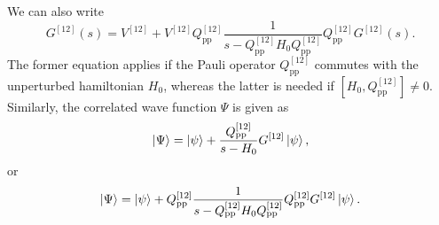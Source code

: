 We can also write  
\begin{equation}
      G^{[12]}(s )=V^{[12]}+V^{[12]}Q^{[12]}_{\mathrm{pp}}
      \frac{1}{s -Q^{[12]}_{\mathrm{pp}}H_0Q^{[12]}_{\mathrm{pp}}}
      Q^{[12]}_{\mathrm{pp}}
      G^{[12]}(s ).
      \label{eq:g2}
\end{equation}
The former equation applies if the Pauli operator $Q^{[12]}_{\mathrm{pp}}$  commutes
with the unperturbed hamiltonian $H_0$, whereas the latter is
needed if $[H_0,Q^{[12]}_{\mathrm{pp}}]\neq 0$.
Similarly, the correlated wave function $\Psi$
is given as
\begin{equation}
    \left| \Psi \right\rangle=\left| \psi \right\rangle+
    \frac{Q^{[12]}_{\mathrm{pp}}}{s - H_0}G^{[12]}\left| \psi \right\rangle,
    \label{eq:wave}
\end{equation}
or
\begin{equation}
   \left| \Psi \right\rangle=\left| \psi \right\rangle+Q^{[12]}_{\mathrm{pp}}\frac{1}
    {s - Q^{[12]}_{\mathrm{pp}}H_0Q^{[12]}_{\mathrm{pp}}}
    Q^{[12]}_{\mathrm{pp}}G^{[12]}\left| \psi \right\rangle.
\end{equation}


